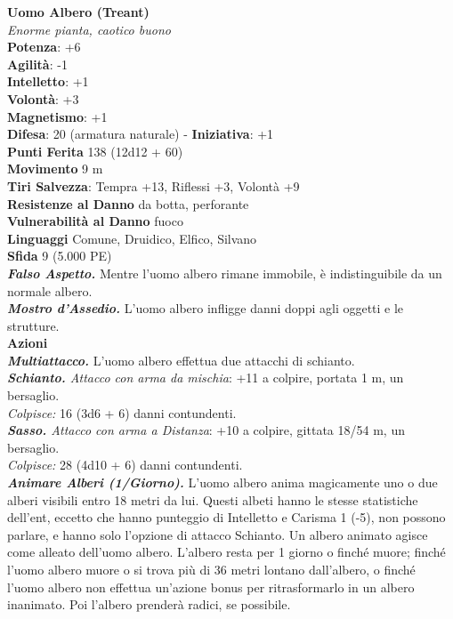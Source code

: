 \begin{multicols}{2}
\medskip\textbf{Uomo Albero (Treant)}\\
\emph{Enorme pianta, caotico buono}\\
\textbf{Potenza}: +6\\
\textbf{Agilità}: -1\\
\textbf{Intelletto}: +1\\
\textbf{Volontà}: +3\\
\textbf{Magnetismo}: +1\\
\textbf{Difesa}: 20 (armatura naturale) - \textbf{Iniziativa}: +1\\
\textbf{Punti Ferita} 138 (12d12 + 60)\\
\textbf{Movimento} 9 m\\
\textbf{Tiri Salvezza}: Tempra +13, Riflessi +3, Volontà +9\\
\textbf{Resistenze al Danno} da botta, perforante\\
\textbf{Vulnerabilità al Danno} fuoco\\
\textbf{Linguaggi} Comune, Druidico, Elfico, Silvano\\
\textbf{Sfida} 9 (5.000 PE)\smallskip\\
\emph{\textbf{Falso Aspetto.}} Mentre l'uomo albero rimane immobile, è indistinguibile da un normale albero.\\
\emph{\textbf{Mostro d'Assedio.}} L'uomo albero infligge danni doppi agli oggetti e le strutture.\\
\smallskip\textbf{Azioni}\\
\emph{\textbf{Multiattacco.}} L'uomo albero effettua due attacchi di schianto.\\
\emph{\textbf{Schianto.} Attacco con arma da mischia}: +11 a colpire, portata 1 m, un bersaglio.\\
\emph{Colpisce:} 16 (3d6 + 6) danni contundenti.\\
\emph{\textbf{Sasso.} Attacco con arma a Distanza}: +10 a colpire, gittata 18/54 m, un bersaglio.\\
\emph{Colpisce:} 28 (4d10 + 6) danni contundenti.\\
\emph{\textbf{Animare Alberi (1/Giorno).}} L'uomo albero anima magicamente uno o due alberi visibili entro 18 metri da lui. Questi albeti hanno le stesse statistiche dell'ent, eccetto che hanno punteggio di Intelletto e Carisma 1 (-5), non possono parlare, e hanno solo l'opzione di attacco Schianto. Un albero animato agisce come alleato dell'uomo albero. L'albero resta per 1 giorno o finché muore; finché l'uomo albero muore o si trova più di 36 metri lontano dall'albero, o finché l'uomo albero non effettua un'azione bonus per ritrasformarlo in un albero inanimato. Poi l'albero prenderà radici, se possibile. \\

\end{multicols}
